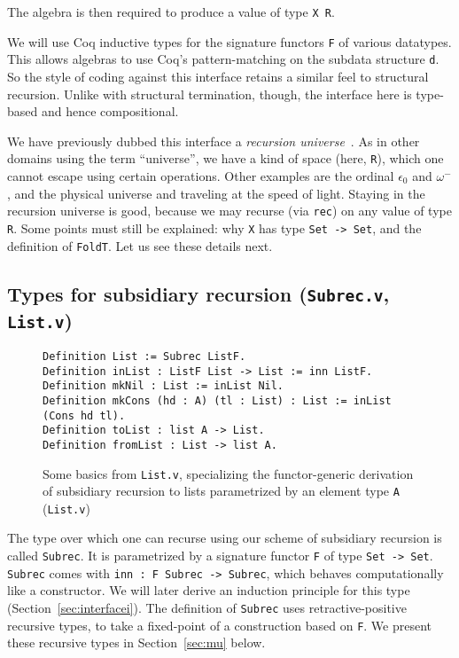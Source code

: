 \documentclass[a4paper,USenglish]{lipics-v2021}
\begin{document}
\noindent The algebra is then required to produce a value of type \verb|X R|.

We will use Coq inductive types for the signature functors \verb|F| of
various datatypes. This allows algebras to use Coq's
pattern-matching on the subdata structure \verb|d|.  So the style of
coding against this interface retains a similar feel to structural
recursion.  Unlike with structural termination, though, the interface
here is type-based and hence compositional.  

We have previously dubbed this interface a \emph{recursion
universe}~\cite{stump20}.  As in other domains using the term
``universe'', we have a kind of space (here, \verb|R|), which one
cannot escape using certain operations.  Other examples are the
ordinal $\epsilon_0$ and $\omega^-$, and the physical universe and
traveling at the speed of light.  Staying in the recursion universe is
good, because we may recurse (via \verb|rec|) on any value of type
\verb|R|.  Some points must still be explained: why \verb|X| has type
\verb|Set -> Set|, and the definition of \verb|FoldT|.  Let us see
these details next.

\subsection{Types for subsidiary recursion (\texttt{Subrec.v}, \texttt{List.v})}


\begin{figure}
\begin{verbatim}
Definition List := Subrec ListF.
Definition inList : ListF List -> List := inn ListF.
Definition mkNil : List := inList Nil.
Definition mkCons (hd : A) (tl : List) : List := inList (Cons hd tl).
Definition toList : list A -> List.
Definition fromList : List -> list A.
\end{verbatim}
  \caption{Some basics from \texttt{List.v}, specializing the functor-generic derivation of subsidiary recursion to lists parametrized by an element type \texttt{A} (\texttt{List.v})}
  \label{fig:listf}
\end{figure}

The type over which one can recurse using our scheme of subsidiary recursion is
called \verb|Subrec|.  It is parametrized by a signature functor
\verb|F| of type \verb|Set -> Set|.  \verb|Subrec| comes with
\verb|inn : F Subrec -> Subrec|, which behaves computationally like a
constructor.  We will later derive an induction principle for this
type (Section~\ref{sec:interfacei}). The definition of \verb|Subrec|
uses retractive-positive recursive types, to take a fixed-point of a
construction based on \verb|F|.  We present these recursive types in
Section~\ref{sec:mu} below.
\end{document}
